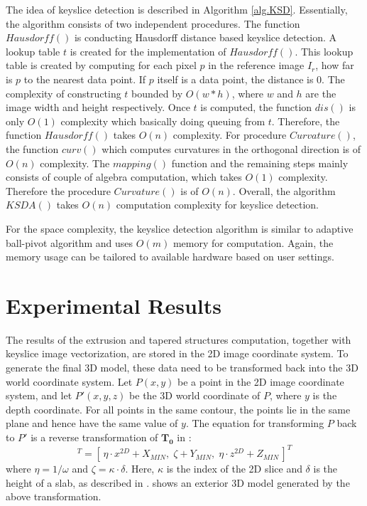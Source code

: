 The idea of keyslice detection is described in Algorithm \ref{alg.KSD}. 
Essentially, the algorithm consists of two independent procedures. 
The function $Hausdorff()$ is conducting Hausdorff distance based keyslice
detection. A lookup table $t$ is created for the implementation of $Hausdorff()$. 
This lookup table is created by computing for each pixel $p$ in the reference image $I_r$,
how far is $p$ to the nearest data point. If $p$ itself is a data point, the distance is 0.
The complexity of constructing $t$ bounded by $O(w*h)$, where $w$ and $h$ are the image
width and height respectively. Once $t$ is computed, the function $dis()$ is only
$O(1)$ complexity which basically doing queuing from $t$. Therefore, the function $Hausdorff()$
takes $O(n)$ complexity. 
For procedure $Curvature()$, the function $curv()$ which computes curvatures
in the orthogonal direction is of $O(n)$ complexity. The $mapping()$ function and
the remaining steps mainly consists of couple of algebra computation, which takes $O(1)$ complexity. 
Therefore the procedure $Curvature()$ is of $O(n)$. Overall, the algorithm $KSDA()$ takes
$O(n)$ computation complexity for keyslice detection. 

For the space complexity, the keyslice detection algorithm is similar to adaptive ball-pivot
algorithm and uses $O(m)$ memory for computation. Again, the memory usage can be tailored to 
available hardware based on user settings.




\section{Experimental Results}
\label{sec:IR_OUT}

The results of the extrusion and tapered structures computation,
together with keyslice image vectorization, are stored in the 2D
image coordinate system. To generate the final 3D model, these
data need to be transformed back into the 3D world coordinate system.
Let $P(x,y)$ be a point in the 2D image coordinate system, and let $P'(x,y,z)$
be the 3D world coordinate of $P$, where $y$ is the depth coordinate.
For all points in the same contour, the points lie in the same plane and
hence have the same value of $y$.
The equation for transforming $P$ back to $P'$ is a reverse transformation
of $\boldsymbol{T_0}$ in :
\begin{equation}
[\,x^{3D},\; y^{3D},\; z^{3D}\,]^T = [\,\eta\cdot x^{2D} + X_{MIN},\; \zeta + Y_{MIN},\; \eta\cdot z^{2D} + Z_{MIN}\,]^T
\label{eq:ir2dxf}
\end{equation}
where $\eta=1/\omega$ and $\zeta=\kappa\cdot\delta$. Here, $\kappa$ is the
index of the 2D slice and $\delta$ is the height of a slab, as described
in .
 shows an exterior 3D model generated by the above
transformation.

